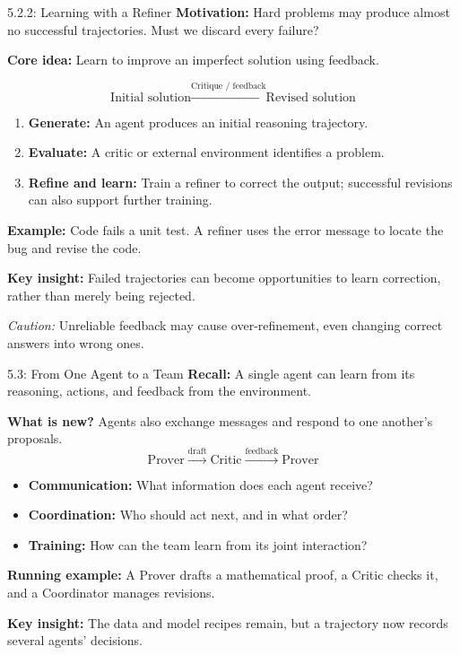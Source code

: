 \documentclass[aspectratio=169]{beamer}
\begin{document}
\begin{frame}{5.2.2: Learning with a Refiner}
\small
\textbf{Motivation:} Hard problems may produce almost no successful trajectories. Must we discard every failure?

\vspace{0.2cm}
\textbf{Core idea:} Learn to improve an imperfect solution using feedback.

\[
\text{Initial solution}
\xrightarrow{\text{Critique / feedback}}
\text{Revised solution}
\]

\begin{enumerate}
    \item \textbf{Generate:} An agent produces an initial reasoning trajectory.
    \item \textbf{Evaluate:} A critic or external environment identifies a problem.
    \item \textbf{Refine and learn:} Train a refiner to correct the output; successful revisions can also support further training.
\end{enumerate}

\vspace{0.15cm}
\textbf{Example:} Code fails a unit test. A refiner uses the error message to locate the bug and revise the code.

\vspace{0.15cm}
\textbf{Key insight:} Failed trajectories can become opportunities to learn correction, rather than merely being rejected.

{\scriptsize \textit{Caution:} Unreliable feedback may cause over-refinement, even changing correct answers into wrong ones.}

\end{frame}

\begin{frame}{5.3: From One Agent to a Team}
\small
\textbf{Recall:} A single agent can learn from its reasoning, actions, and feedback from the environment.

\vspace{0.15cm}
\textbf{What is new?} Agents also exchange messages and respond to one another's proposals.
\[
\text{Prover}\xrightarrow{\text{draft}}\text{Critic}
\xrightarrow{\text{feedback}}\text{Prover}
\]

\begin{itemize}
    \item \textbf{Communication:} What information does each agent receive?
    \item \textbf{Coordination:} Who should act next, and in what order?
    \item \textbf{Training:} How can the team learn from its joint interaction?
\end{itemize}

\textbf{Running example:} A Prover drafts a mathematical proof, a Critic checks it, and a Coordinator manages revisions.

\vspace{0.15cm}
\textbf{Key insight:} The data and model recipes remain, but a trajectory now records several agents' decisions.

\end{frame}
\end{document}
